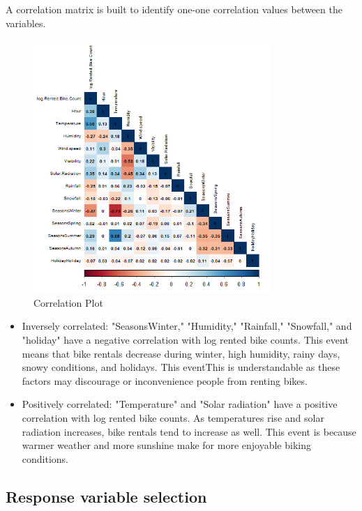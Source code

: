 \documentclass[12 pt]{scrartcl}
\begin{document}
A correlation matrix is built to identify one-one correlation values between the variables.

\begin{figure}[ht]
\centering
\includegraphics[width=0.8\textwidth]{Correlation plot.png}
\caption{Correlation Plot}
\label{fig: Correlation plot}
\end{figure}
\begin{itemize}
    \item Inversely correlated: "SeasonsWinter," "Humidity," "Rainfall," "Snowfall," and "holiday" have a negative correlation with log rented bike counts. This event means that bike rentals decrease during winter, high humidity, rainy days, snowy conditions, and holidays. This eventThis is understandable as these factors may discourage or inconvenience people from renting bikes.

    \item Positively correlated: "Temperature" and "Solar radiation" have a positive correlation with log rented bike counts. As temperatures rise and solar radiation increases, bike rentals tend to increase as well. This event is because warmer weather and more sunshine make for more enjoyable biking conditions.
\end{itemize}



\subsection{Response variable selection}
\end{document}
